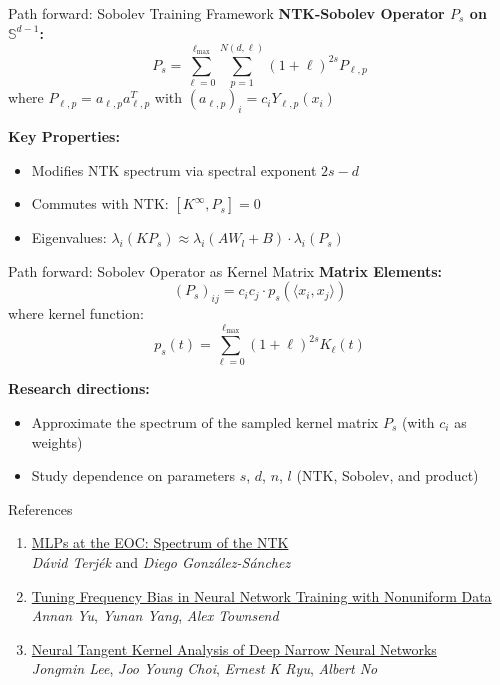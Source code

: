 \documentclass{beamer}
\begin{document}
\begin{frame}{Path forward: Sobolev Training Framework}
\textbf{NTK-Sobolev Operator $P_s$ on $\mathbb{S}^{d-1}$:}
\[ P_s = \sum_{\ell=0}^{\ell_{\max}} \sum_{p=1}^{N(d,\ell)} (1+\ell)^{2s}P_{\ell,p} \]
where $P_{\ell,p} = a_{\ell,p}a_{\ell,p}^T$ with $(a_{\ell,p})_i = c_iY_{\ell,p}(x_i)$

\textbf{Key Properties:}
\begin{itemize}
\item Modifies NTK spectrum via spectral exponent $2s-d$
\item Commutes with NTK: $[K^{\infty}, P_s] = 0$ 
\item Eigenvalues: $\lambda_i(K P_s) \approx \lambda_i(A W_l + B) \cdot \lambda_i(P_s)$
\end{itemize}
\end{frame}

\begin{frame}{Path forward: Sobolev Operator as Kernel Matrix}
\textbf{Matrix Elements:}
\[ (P_s)_{ij} = c_i c_j \cdot p_s(\langle x_i, x_j \rangle) \]
where kernel function:
\[ p_s(t) = \sum_{\ell=0}^{\ell_{\max}} (1+\ell)^{2s} K_\ell(t) \]

\textbf{ Research directions:}
\begin{itemize}
\item Approximate the spectrum of the sampled kernel matrix $P_s$ (with $c_i$ as weights)
\item Study dependence on parameters $s$, $d$, $n$, $l$ (NTK, Sobolev, and product)
\end{itemize}
\end{frame}


\begin{frame}{References}
\begin{enumerate}
\item \href{https://arxiv.org/abs/2501.13225}{MLPs at the EOC: Spectrum of the NTK} \\
      \textit{Dávid Terjék} and \textit{Diego González-Sánchez}

\item \href{https://openreview.net/forum?id=oLIZ2jGTiv}{Tuning Frequency Bias in Neural Network Training with Nonuniform Data} \\
      \textit{Annan Yu}, \textit{Yunan Yang}, \textit{Alex Townsend}

\item \href{https://proceedings.mlr.press/v162/lee22a.html}{Neural Tangent Kernel Analysis of Deep Narrow Neural Networks} \\
      \textit{Jongmin Lee}, \textit{Joo Young Choi}, \textit{Ernest K Ryu}, \textit{Albert No}
\end{enumerate}
\end{frame}
\end{document}
